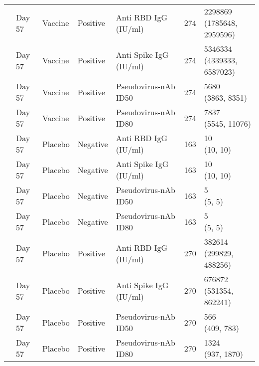 \documentclass[]{book}
\theoremstyle{definition}
\theoremstyle{definition}
\theoremstyle{definition}
\newcommand{\1}{\mathbbm{1}}
\begin{document}
\begin{landscape}
\begin{ThreePartTable}
\begin{longtable}[t]{>{\raggedright\arraybackslash}p{7cm}llllll}
\hspace{1em} & Day 57 & Vaccine & Positive & Anti RBD IgG (IU/ml) & 274 & \makecell[l]{2298869\\(1785648, 2959596)}\\
\hspace{1em} & Day 57 & Vaccine & Positive & Anti Spike IgG (IU/ml) & 274 & \makecell[l]{5346334\\(4339333, 6587023)}\\
\hspace{1em} & Day 57 & Vaccine & Positive & Pseudovirus-nAb ID50 & 274 & \makecell[l]{5680\\(3863, 8351)}\\
\hspace{1em} & Day 57 & Vaccine & Positive & Pseudovirus-nAb ID80 & 274 & \makecell[l]{7837\\(5545, 11076)}\\
\hspace{1em} & Day 57 & Placebo & Negative & Anti RBD IgG (IU/ml) & 163 & \makecell[l]{10\\(10, 10)}\\
\hspace{1em} & Day 57 & Placebo & Negative & Anti Spike IgG (IU/ml) & 163 & \makecell[l]{10\\(10, 10)}\\
\hspace{1em} & Day 57 & Placebo & Negative & Pseudovirus-nAb ID50 & 163 & \makecell[l]{5\\(5, 5)}\\
\hspace{1em} & Day 57 & Placebo & Negative & Pseudovirus-nAb ID80 & 163 & \makecell[l]{5\\(5, 5)}\\
\hspace{1em} & Day 57 & Placebo & Positive & Anti RBD IgG (IU/ml) & 270 & \makecell[l]{382614\\(299829, 488256)}\\
\hspace{1em} & Day 57 & Placebo & Positive & Anti Spike IgG (IU/ml) & 270 & \makecell[l]{676872\\(531354, 862241)}\\
\hspace{1em} & Day 57 & Placebo & Positive & Pseudovirus-nAb ID50 & 270 & \makecell[l]{566\\(409, 783)}\\
\hspace{1em} & Day 57 & Placebo & Positive & Pseudovirus-nAb ID80 & 270 & \makecell[l]{1324\\(937, 1870)}\\*
\end{longtable}
\end{ThreePartTable}



\end{landscape}
\end{document}
